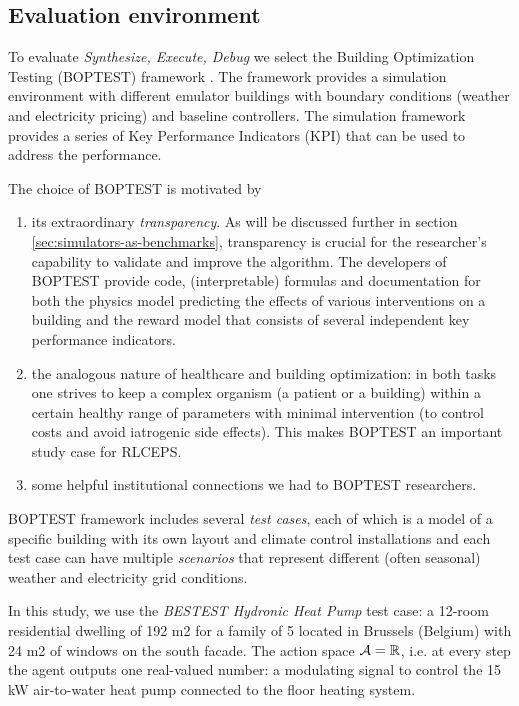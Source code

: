 \subsection{Evaluation environment}

To evaluate \emph{Synthesize, Execute, Debug} we select the Building Optimization Testing (BOPTEST) framework \cite{blumBuildingOptimizationTesting2021}.
The framework provides a simulation environment with different emulator buildings with boundary conditions (weather and electricity pricing) and baseline controllers. 
The simulation framework provides a series of Key Performance Indicators (KPI) that can be used to address the performance.

The choice of BOPTEST is motivated by 
\begin{enumerate}
\item its extraordinary \emph{transparency}. As will be discussed further in section \ref{sec:simulators-as-benchmarks}, transparency is crucial for the researcher's capability to validate and improve the algorithm.
The developers of BOPTEST provide code, (interpretable) formulas and documentation for both the physics model predicting the effects of various interventions on a building and the reward model that consists of several independent key performance indicators.
\item the analogous nature of healthcare and building optimization: in both tasks one strives to keep a complex organism (a patient or a building) within a certain healthy range of parameters with minimal intervention (to control costs and avoid iatrogenic side effects). This makes BOPTEST an important study case for RLCEPS.
\item some helpful institutional connections we had to BOPTEST researchers.
\end{enumerate}

BOPTEST framework includes several \emph{test cases}, each of which is a model of a specific building with its own layout and climate control installations and each test case can have multiple \emph{scenarios} that represent different (often seasonal) weather and electricity grid conditions.

In this study, we use the \emph{BESTEST Hydronic Heat Pump} test case: a 12-room residential dwelling of 192 m2 for a family of 5 located in Brussels (Belgium) with 24 m2 of windows on the south facade. 
The action space $\mathcal{A} = \mathbb{R}$, i.e. at every step the agent outputs one real-valued number: a modulating signal to control the 15 kW air-to-water heat pump connected to the floor heating system. 

